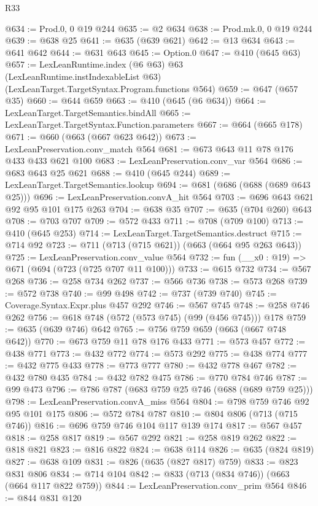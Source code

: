 \begin{lexlean}{R33}
\begin{coremodule}
@634 := Prod.{0, 0} @19 @244
@635 := @2 @634
@638 := Prod.mk.{0, 0} @19 @244
@639 := @638 @25
@641 := @635 (@639 @621)
@642 := @13 @634
@643 := @641 @642
@644 := @631 @643
@645 := Option.{0}
@647 := @410 (@645 @63)
@657 := LexLeanRuntime.index
    (@6 @63)
    @63
    (LexLeanRuntime.instIndexableList @63)
    (LexLeanTarget.TargetSyntax.Program.functions @564)
@659 := @647 (@657 @35)
@660 := @644 @659
@663 := @410 (@645 (@6 @634))
@664 := LexLeanTarget.TargetSemantics.bindAll
@665 := LexLeanTarget.TargetSyntax.Function.parameters
@667 := @664 (@665 @178)
@671 := @660 (@663 (@667 @623 @642))
@673 := LexLeanPreservation.conv_match @564
@681 := @673 @643 @11 @78 @176 @433 @433 @621 @100
@683 := LexLeanPreservation.conv_var @564
@686 := @683 @643 @25 @621
@688 := @410 (@645 @244)
@689 := LexLeanTarget.TargetSemantics.lookup
@694 := @681 (@686 (@688 (@689 @643 @25)))
@696 := LexLeanPreservation.convA_hit @564
@703 := @696 @643 @621 @92 @95 @101 @175 @263
@704 := @638 @35
@707 := @635 (@704 @260) @643
@708 := @703 @707
@709 := @572 @433
@711 := @708 (@709 @100)
@713 := @410 (@645 @253)
@714 := LexLeanTarget.TargetSemantics.destruct
@715 := @714 @92
@723 := @711 (@713 (@715 @621)) (@663 (@664 @95 @263 @643))
@725 := LexLeanPreservation.conv_value @564
@732 := fun (__x0 : @19) => @671 (@694 (@723 (@725 @707 @11 @100)))
@733 := @615 @732
@734 := @567 @268
@736 := @258 @734 @262
@737 := @566 @736
@738 := @573 @268
@739 := @572 @738
@740 := @99 @498
@742 := @737 (@739 @740)
@745 := Coverage.Syntax.Expr.plus @457 @292
@746 := @567 @745
@748 := @258 @746 @262
@756 := @618 @748 (@572 (@573 @745) (@99 (@456 @745))) @178
@759 := @635 (@639 @746) @642
@765 := @756 @759 @659 (@663 (@667 @748 @642))
@770 := @673 @759 @11 @78 @176 @433
@771 := @573 @457
@772 := @438 @771
@773 := @432 @772
@774 := @573 @292
@775 := @438 @774
@777 := @432 @775 @433
@778 := @773 @777
@780 := @432 @778 @467
@782 := @432 @780 @435
@784 := @432 @782 @475
@786 := @770 @784 @746
@787 := @99 @473
@796 := @786 @787 (@683 @759 @25 @746 (@688 (@689 @759 @25)))
@798 := LexLeanPreservation.convA_miss @564
@804 := @798 @759 @746 @92 @95 @101 @175
@806 := @572 @784 @787
@810 := @804 @806 (@713 (@715 @746))
@816 := @696 @759 @746 @104 @117 @139 @174
@817 := @567 @457
@818 := @258 @817
@819 := @567 @292
@821 := @258 @819 @262
@822 := @818 @821
@823 := @816 @822
@824 := @638 @114
@826 := @635 (@824 @819)
@827 := @638 @109
@831 := @826 (@635 (@827 @817) @759)
@833 := @823 @831 @806
@834 := @714 @104
@842 := @833 (@713 (@834 @746)) (@663 (@664 @117 @822 @759))
@844 := LexLeanPreservation.conv_prim @564
@846 := @844 @831 @120

\end{coremodule}
\end{lexlean}
